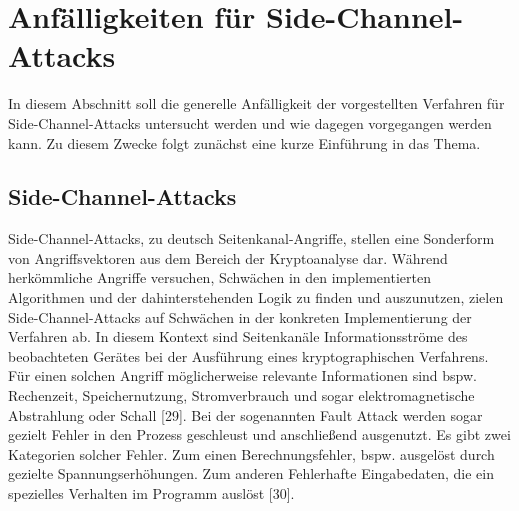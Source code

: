 \documentclass[conference,10pt,a4paper,twocolumn]{IEEEtran}
\begin{document}
\section{Anfälligkeiten für Side-Channel-Attacks}
In diesem Abschnitt soll die generelle Anfälligkeit der vorgestellten Verfahren für Side-Channel-Attacks untersucht werden und wie dagegen vorgegangen werden kann.
Zu diesem Zwecke folgt zunächst eine kurze Einführung in das Thema.

\subsection{Side-Channel-Attacks}
Side-Channel-Attacks, zu deutsch Seitenkanal-Angriffe, stellen eine Sonderform von Angriffsvektoren aus dem Bereich der Kryptoanalyse dar. Während herkömmliche Angriffe versuchen, Schwächen in den implementierten Algorithmen und der dahinterstehenden Logik zu finden und auszunutzen, zielen Side-Channel-Attacks auf Schwächen in der konkreten Implementierung der Verfahren ab. In diesem Kontext sind Seitenkanäle Informationsströme des beobachteten Gerätes bei der Ausführung eines kryptographischen Verfahrens. Für einen solchen Angriff möglicherweise relevante Informationen sind bspw. Rechenzeit, Speichernutzung, Stromverbrauch und sogar elektromagnetische Abstrahlung oder Schall [29]. Bei der sogenannten Fault Attack werden sogar gezielt Fehler in den Prozess geschleust und anschließend ausgenutzt. Es gibt zwei Kategorien solcher Fehler. Zum einen Berechnungsfehler, bspw. ausgelöst durch gezielte Spannungserhöhungen. Zum anderen Fehlerhafte Eingabedaten, die ein spezielles Verhalten im Programm auslöst [30].
\end{document}
